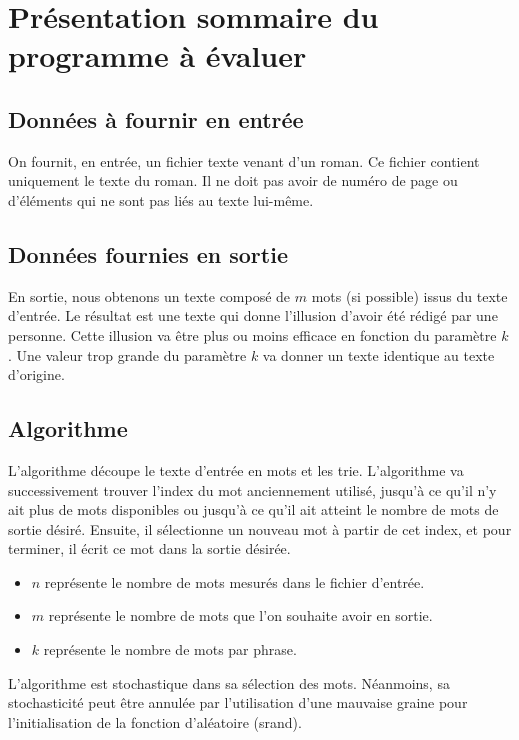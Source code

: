 
\section{Présentation sommaire du programme à évaluer}

\subsection{Données à fournir en entrée}

On fournit, en entrée, un fichier texte venant d'un roman.
Ce fichier contient uniquement le texte du roman. Il ne doit pas avoir de numéro de page ou d'éléments qui ne sont pas liés au texte lui-même.

\subsection{Données fournies en sortie}

En sortie, nous obtenons un texte composé de $m$ mots (si possible) issus du texte d'entrée.
Le résultat est une texte qui donne l'illusion d'avoir été rédigé par une personne.
Cette illusion va être plus ou moins efficace en fonction du paramètre $k$.
Une valeur trop grande du paramètre $k$ va donner un texte identique au texte d'origine.

\subsection{Algorithme}


L'algorithme découpe le texte d'entrée en mots et les trie.
L'algorithme va successivement trouver l'index du mot anciennement utilisé, jusqu'à ce qu'il n'y ait plus de mots disponibles ou jusqu'à ce qu'il ait atteint le nombre de mots de sortie désiré. Ensuite, il sélectionne un nouveau mot à partir de cet index, et pour terminer, il écrit ce mot dans la sortie désirée.



\begin{itemize}
	\item $n$ représente le nombre de mots mesurés dans le fichier d'entrée.
	\item $m$ représente le nombre de mots que l'on souhaite avoir en sortie.
	\item $k$ représente le nombre de mots par phrase.
\end{itemize}

L'algorithme est stochastique dans sa sélection des mots. Néanmoins, sa stochasticité peut être annulée par l'utilisation d'une mauvaise graine pour l'initialisation de la fonction d'aléatoire (srand).

